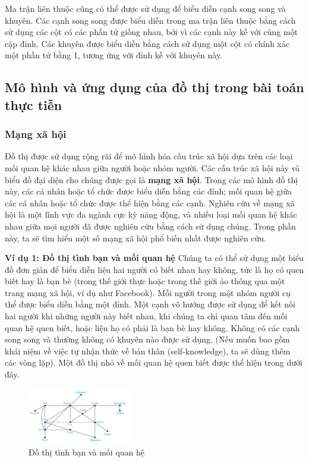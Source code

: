 Ma trận liên thuộc cũng có thể được sử dụng để biểu diễn cạnh song song và khuyên. Các cạnh song song được biểu diễn trong ma trận liên thuộc bằng cách sử dụng các cột có các phần tử giống nhau, bởi vì các cạnh này kề với cùng một cặp đỉnh. Các khuyên được biểu diễn bằng cách sử dụng một cột có chính xác một phần tử bằng 1, tương ứng với đỉnh kề với khuyên này.

\subsection{Mô hình và ứng dụng của đồ thị trong bài toán thực tiễn}

\subsubsection{Mạng xã hội}

Đồ thị được sử dụng rộng rãi để mô hình hóa cấu trúc xã hội dựa trên các loại mối quan hệ khác nhau giữa người hoặc nhóm người. Các cấu trúc xã hội này và biểu đồ đại diện cho chúng được gọi là \textbf{mạng xã hội}. Trong các mô hình đồ thị này, các cá nhân hoặc tổ chức được biểu diễn bằng các đỉnh; mối quan hệ giữa các cá nhân hoặc tổ chức được thể hiện bằng các cạnh. Nghiên cứu về mạng xã hội là một lĩnh vực đa ngành cực kỳ năng động, và nhiều loại mối quan hệ khác nhau giữa mọi người đã được nghiên cứu bằng cách sử dụng chúng. Trong phần này, ta sẽ tìm hiểu một số mạng xã hội phổ biến nhất được nghiên cứu.

\textbf{Ví dụ 1: Đồ thị tình bạn và mối quan hệ}
Chúng ta có thể sử dụng một biểu đồ đơn giản để biểu diễn liệu hai người có biết nhau hay không, tức là họ có quen biết hay là bạn bè (trong thế giới thực hoặc trong thế giới ảo thông qua một trang mạng xã hội, ví dụ như Facebook). Mỗi người trong một nhóm người cụ thể được biểu diễn bằng một đỉnh. Một cạnh vô hướng được sử dụng để kết nối hai người khi những người này biết nhau, khi chúng ta chỉ quan tâm đến mối quan hệ quen biết, hoặc liệu họ có phải là bạn bè hay không. Không có các cạnh song song và thường không có khuyên nào được sử dụng. (Nếu muốn bao gồm khái niệm về việc tự nhận thức về bản thân (self-knowledge), ta sẽ dùng thêm các vòng lặp). Một đồ thị nhỏ về mối quan hệ quen biết được thể hiện trong dưới đây.

\begin{figure}[H] %
    \centering %
    \includegraphics[width=0.4\textwidth]{assets/pic6.png} 
    \caption{Đồ thị tình bạn và mối quan hệ} %
\end{figure}


